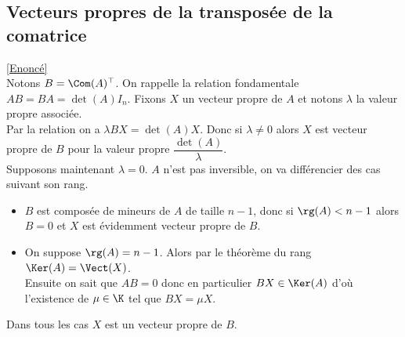 \documentclass[8pt]{book}
\begin{document}
	\subsection{Vecteurs propres de la transposée de la comatrice }
	\label{Vecteurs propres de la transposée de la comatrice corrigé}
	\textcolor{blue}{\hyperref[Vecteurs propres de la transposée de la comatrice]{[Enoncé]}}\\
	Notons $B=\Com(A)^\top$. On rappelle la relation fondamentale $AB=BA=\det(A)I_n$. Fixons $X$ un vecteur propre de $A$ et notons $\lambda$ la valeur propre associée.\\
	Par la relation on a $\lambda BX=\det(A)X$. Donc si $\lambda\ne 0$ alors $X$ est vecteur propre de $B$ pour la valeur propre $\dfrac{\det(A)}{\lambda}$.\\
	Supposons maintenant $\lambda=0$. $A$ n'est pas inversible, on va différencier des cas suivant son rang.
	\begin{itemize}
		\item $B$ est composée de mineurs de $A$ de taille $n-1$, donc si $\rg(A)<n-1$ alors $B=0$ et $X$ est évidemment vecteur propre de $B$.
		\item On suppose $\rg(A)=n-1$. Alors par le théorème du rang $\Ker(A)=\Vect(X)$.\\
		Ensuite on sait que $AB=0$ donc en particulier $BX\in \Ker(A)$ d'où l'existence de $\mu\in \K$ tel que $BX=\mu X$.
	\end{itemize}
	Dans tous les cas $X$ est un vecteur propre de $B$.
	
\end{document}
